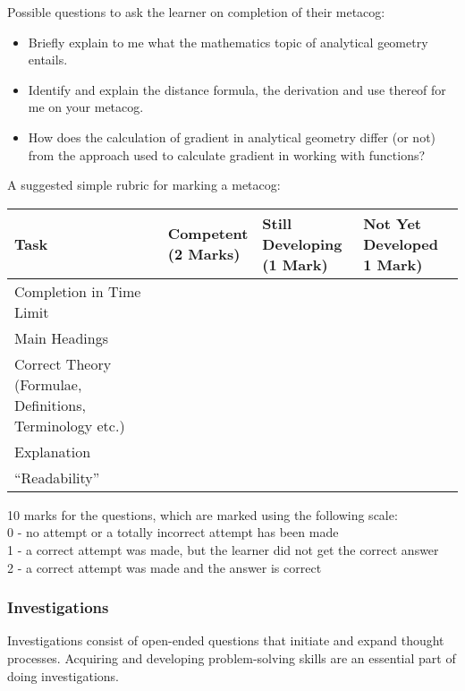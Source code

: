 Possible questions to ask the learner on completion of their metacog: 
\begin{itemize}
\item Briefly explain to me what the mathematics topic of analytical geometry entails.
\item Identify and explain the distance formula, the derivation and use thereof for me on your metacog.
\item How does the calculation of gradient in analytical geometry differ (or not) from the approach used to calculate gradient in working with functions? 
\end{itemize}
A suggested simple rubric for marking a metacog:
\begin{table}[H]
 \begin{center}
  \begin{tabular}{|p{3cm}|p{2.5cm}|p{2.5cm}|p{3cm}|} \hline
  \textbf{Task} & \textbf{Competent \newline(2 Marks)} & \textbf{Still Developing \newline(1 Mark)}& \textbf{Not Yet Developed \newline 1 Mark)}\\ \hline
Completion in Time Limit &&&\\ \hline
Main Headings&&&\\ \hline
Correct Theory (Formulae, Definitions, Terminology etc.) &&&\\ \hline
Explanation &&&\\ \hline
“Readability”&&&\\ \hline

  \end{tabular}

 \end{center}

\end{table}

10 marks for the questions, which are marked using the following scale:\\
0	-	no attempt or a totally incorrect attempt has been made \\
1	-	a correct attempt was made, but the learner did not get the correct answer \\
2	-	a correct attempt was made and the answer is correct\\

\subsubsection{Investigations}
Investigations consist of open-ended questions that initiate and expand thought processes. Acquiring and developing problem-solving skills are an essential part of doing investigations. \par 


